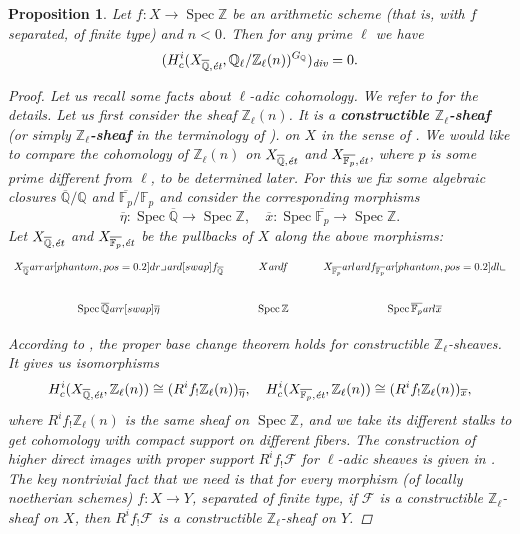\documentclass[draft,leqno,12pt]{article}
\theoremstyle{plain}
\newtheorem{proposition}[theorem]{\indent\sc Proposition}
\theoremstyle{definition}
\DeclareMathOperator{\Spec}{Spec}
\newcommand{\ZZ}{\mathbb{Z}}
\newcommand{\QQ}{\mathbb{Q}}
\newcommand{\FF}{\mathbb{F}}
\renewcommand{\div}{\text{\it div}}
\newcommand{\ar}{\text{\it ar}}
\newcommand{\tikzpb}{\ar[phantom,pos=0.2]{dr}{\text{\large$\lrcorner$}}}
\newcommand{\tikzpbur}{\ar[phantom,pos=0.2]{dl}{\text{\large$\llcorner$}}}
\begin{document}
\begin{proposition}
  \label{prop:l-adic-cohomology-key-lemma}
  Let $f\colon X\to \Spec \ZZ$ be an arithmetic scheme (that is, with $f$
  separated, of finite type) and $n < 0$. Then for any prime $\ell$ we have
  $$(H^i_c (X_{\overline{\QQ},\text{\it \'{e}t}}, \QQ_\ell/\ZZ_\ell (n))^{G_\QQ})_\div = 0.$$

  \begin{proof}
    Let us recall some facts about $\ell$-adic cohomology. We refer to
    \cite[Expos\'{e}~VI]{SGA5} for the details. Let us first consider the sheaf
    $\ZZ_\ell (n)$. It is a
    \textbf{constructible $\ZZ_\ell$-sheaf} (or simply
      \textbf{$\ZZ_\ell$-sheaf} in the terminology of \cite[Rapport]{SGA4-1-2}).
    on $X$ in the sense of \cite[Expos\'{e}~VI, 1.1.1]{SGA5}. We would like to
    compare the cohomology of $\ZZ_\ell (n)$ on
    $X_{\overline{\QQ},\text{\it \'{e}t}}$ and $X_{\overline{\FF_p},\text{\it \'{e}t}}$,
    where $p$ is some prime different from $\ell$, to be determined later.
    For this we fix some algebraic closures $\overline{\QQ}/\QQ$ and
    $\overline{\FF_p}/\FF_p$ and consider the corresponding morphisms
    \[ \overline{\eta}\colon \Spec \overline{\QQ} \to \Spec \ZZ, \quad
    \overline{x}\colon \Spec \overline{\FF_p} \to \Spec \ZZ. \]
    Let $X_{\overline{\QQ},\text{\it \'{e}t}}$ and
    $X_{\overline{\FF_p},\text{\it \'{e}t}}$ be the pullbacks of $X$ along the above
    morphisms:
    \[ \begin{tikzcd}
      X_{\overline{\QQ}} \ar{r}\tikzpb\ar{d}[swap]{f_{\overline{\QQ}}} & X \ar{d}{f} & X_{\overline{\FF_p}} \ar{l}\ar{d}{f_{\overline{\FF_p}}}\tikzpbur \\
      \Spec \overline{\QQ} \ar{r}[swap]{\overline{\eta}} & \Spec \ZZ & \Spec \overline{\FF_p} \ar{l}{\overline{x}}
    \end{tikzcd} \]

    According to \cite[Expos\'{e}~VI, 2.2.3]{SGA5}, the proper base change theorem
    holds for constructible $\ZZ_\ell$-sheaves. It gives us isomorphisms
    \[ H^i_c (X_{\overline{\QQ}, \text{\it \'{e}t}}, \ZZ_\ell (n)) \cong (R^i f_! \ZZ_\ell (n))_{\overline{\eta}}, \quad
    H^i_c (X_{\overline{\FF_p}, \text{\it \'{e}t}}, \ZZ_\ell (n)) \cong (R^i f_! \ZZ_\ell (n))_{\overline{x}}, \]
    where $R^i f_! \ZZ_\ell (n)$ is the same sheaf on $\Spec \ZZ$, and we take
    its different stalks to get cohomology with compact support on different
    fibers. The construction of higher direct images with proper support
    $R^i f_! \mathcal{F}$ for $\ell$-adic sheaves is given in
    \cite[Expos\'{e}~VI, \S 2.2]{SGA5}. The key nontrivial fact that we need is that
    for every morphism (of locally noetherian schemes) $f\colon X\to Y$,
    separated of finite type, if $\mathcal{F}$ is a constructible
    $\ZZ_\ell$-sheaf on $X$, then $R^i f_! \mathcal{F}$ is a constructible
    $\ZZ_\ell$-sheaf on $Y$.


\end{proof}
\end{proposition}
\end{document}
